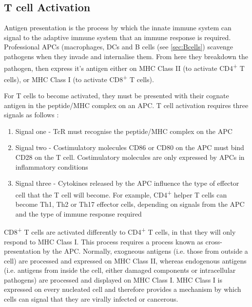 \subsection{T cell Activation}
\label{subsec:Tcellactivation}


Antigen presentation is the process by which the innate immune system can signal to the adaptive immune system that an immune response is required.
Professional APCs (macrophages, DCs and B cells (see \cref{sec:Bcells}) scavenge pathogens when they invade and internalise them.
From here they breakdown the pathogen, then express it's antigen either on MHC Class II (to activate CD4\textsuperscript{+} T cells), or MHC Class I (to activate CD8\textsuperscript{+} T cells).

For T cells to become activated, they must be presented with their cognate antigen in the peptide/MHC complex on an APC.
T cell activation requires three signals as follows \citep{Corthay2006, Kapsenberg2003}:
\begin{enumerate}
\item Signal one - TcR must recognise the peptide/MHC complex on the APC
\item Signal two - Costimulatory molecules CD86 or CD80 on the APC must bind CD28 on the T cell. Costimulatory molecules are only expressed by APCs in inflammatory conditions
\item Signal three - Cytokines released by the APC influence the type of effector cell that the T cell will become. For example, CD4\textsuperscript{+} helper T cells can become Th1, Th2 or Th17 effector cells, depending on signals from the APC and the type of immune response required \citep{Kapsenberg2003}
\end{enumerate}

CD8\textsuperscript{+} T cells are activated differently to CD4\textsuperscript{+} T cells, in that they will only respond to MHC Class I.
This process requires a process known as cross-presentation by the APC.
Normally, exogneous antigens (i.e. those from outside a cell) are processed and expressed on MHC Class II, whereas endogenous antigens (i.e. antigens from inside the cell, either damaged components or intracellular pathogens) are processed and displayed on MHC Class I.
MHC Class I is expressed on every nucleated cell and therefore provides a mechanism by which cells can signal that they are virally infected or cancerous.

